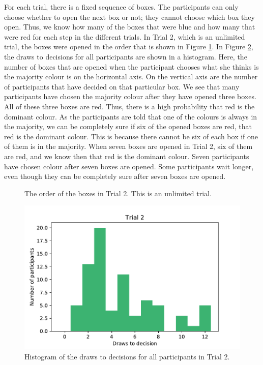 For each trial, there is a fixed sequence of boxes. The participants can only choose whether to open the next box or not; they cannot choose which box they open. Thus, we know how many of the boxes that were blue and how many that were red for each step in the different trials. In Trial 2, which is an unlimited trial, the boxes were opened in the order that is shown in Figure \ref{fig:trial2_order}. In Figure \ref{fig:histogram_trial2}, the draws to decisions for all participants are shown in a histogram. Here, the number of boxes that are opened when the participant chooses what she thinks is the majority colour is on the horizontal axis. On the vertical axis are the number of participants that have decided on that particular box. We see that many participants have chosen the majority colour after they have opened three boxes. All of these three boxes are red. Thus, there is a high probability that red is the dominant colour. 
As the participants are told that one of the colours is always in the majority, we can be completely sure if six of the opened boxes are red, that red is the dominant colour. This is because there cannot be six of each box if one of them is in the majority. When seven boxes are opened in Trial 2, six of them are red, and we know then that red is the dominant colour. Seven participants have chosen colour after seven boxes are opened. Some participants wait longer, even though they can be completely sure after seven boxes are opened.
\begin{figure}
    \centering
    \scalebox{0.8}{}
    \caption[Order of Boxes in Trial 2]{The order of the boxes in Trial 2. This is an unlimited trial.}
    \label{fig:trial2_order}
\end{figure}


\begin{figure}
    \centering
    \includegraphics[scale=0.6]{pictures/dtd2_histogram.pdf}
    \caption[Draws to Decisions in Trial 2]{Histogram of the draws to decisions for all participants in Trial 2.}
    \label{fig:histogram_trial2}
\end{figure}


